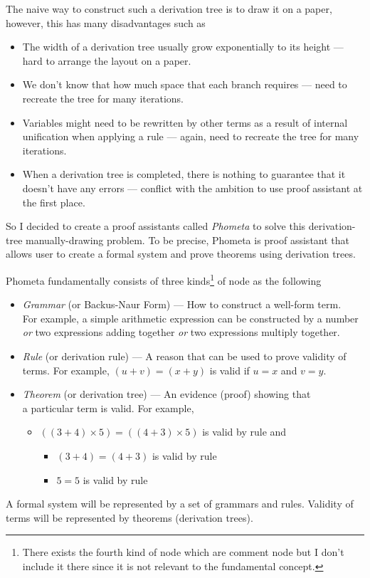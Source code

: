 \documentclass[master.tex]{subfiles}
\begin{document}
The naive way to construct such a derivation tree is to draw it on a paper,
however, this has many disadvantages such as
\begin{itemize}
\item The width of a derivation tree usually grow exponentially to its height ---
  hard to arrange the layout on a paper.
\item We don't know that how much space that each branch requires --- need to
  recreate the tree for many iterations.
\item Variables might need to be rewritten by other terms as a result of
  internal unification when applying a rule --- again, need to recreate the tree
  for many iterations.
\item When a derivation tree is completed, there is nothing to guarantee that it
  doesn't have any errors --- conflict with the ambition to use proof assistant
  at the first place.
\end{itemize}
So I decided to create a proof assistants called \emph{Phometa} to solve this
derivation-tree manually-drawing problem. To be precise, Phometa is proof
assistant that allows user to create a formal system and prove theorems using
derivation trees.

Phometa fundamentally consists of three kinds\footnote{There exists the fourth
  kind of node which are comment node but I don't include it there since it is
  not relevant to the fundamental concept.} of node as the following
\begin{itemize}
\item \emph{Grammar} (or Backus-Naur Form) --- How to construct a well-form
  term.\\ For example, a simple arithmetic expression can be constructed by a
  number \emph{or} two expressions adding together \emph{or} two expressions
  multiply together.
\item \emph{Rule} (or derivation rule) --- A reason that can be used to prove
  validity of terms. For example, $(u + v) = (x + y)$ is valid if $u = x$ and $v
  = y$.
\item \emph{Theorem} (or derivation tree) --- An evidence (proof) showing that \\
  a particular term is valid. For example,
  \begin{itemize}
  \item[] $((3 + 4) \times 5) = ((4 + 3) \times 5)$ is valid by rule
     and
    \begin{itemize}
    \item[] $(3 + 4) = (4 + 3)$ is valid by rule 
    \item[] $5 = 5$ is valid by rule 
    \end{itemize}
  \end{itemize}
\end{itemize}
A formal system will be represented by a set of grammars and rules. Validity of
terms will be represented by theorems (derivation trees).
\end{document}
